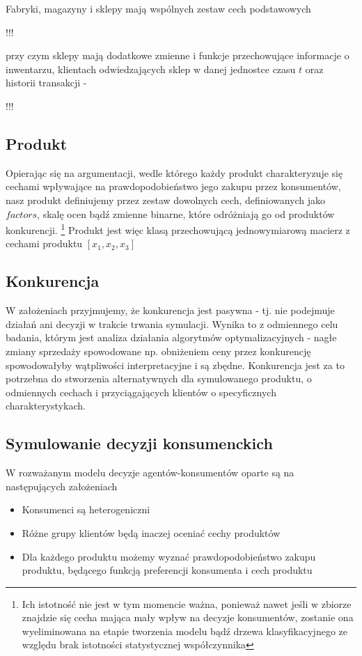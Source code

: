 \documentclass{article}
\begin{document}
Fabryki, magazyny i sklepy mają wspólnych zestaw cech podstawowych 

!!!

przy czym sklepy mają dodatkowe zmienne i funkcje przechowujące informacje o inwentarzu, klientach odwiedzających sklep w danej jednostce czasu $t$ oraz historii transakcji - 

!!!


\subsection{Produkt}

Opierając się na argumentacji, wedle którego każdy produkt charakteryzuje się cechami wpływające na prawdopodobieństwo jego zakupu przez konsumentów, nasz produkt definiujemy przez zestaw dowolnych cech, definiowanych jako $factors$, skalę ocen bądź zmienne binarne, które odróżniają go od produktów konkurencji. \footnote{Ich istotność nie jest w tym momencie ważna, ponieważ nawet jeśli w zbiorze znajdzie się cecha mająca mały wpływ na decyzje konsumentów, zostanie ona wyeliminowana na etapie tworzenia modelu bądź drzewa klasyfikacyjnego ze względu brak istotności statystycznej współczynnika} Produkt jest więc klasą przechowującą jednowymiarową macierz z cechami produktu $[x_1,x_2,x_3]$

\subsection{Konkurencja}
 
W założeniach przyjmujemy, że konkurencja jest pasywna - tj. nie podejmuje działań ani decyzji w trakcie trwania symulacji. Wynika to z odmiennego celu badania, którym jest analiza działania algorytmów optymalizacyjnych - nagłe zmiany sprzedaży spowodowane np. obniżeniem ceny przez konkurencję spowodowałyby wątpliwości interpretacyjne i są zbędne. Konkurencja jest za to potrzebna do stworzenia alternatywnych dla symulowanego produktu, o odmiennych cechach i przyciągających klientów o specyficznych charakterystykach. 

\subsection{Symulowanie decyzji konsumenckich}

W rozważanym modelu decyzje agentów-konsumentów oparte są na następujących założeniach

	\begin{itemize}
		\item Konsumenci są heterogeniczni
		\item Różne grupy klientów będą inaczej oceniać cechy produktów
		\item Dla każdego produktu możemy wyznać prawdopodobieństwo zakupu produktu, będącego funkcją preferencji konsumenta i cech produktu
	\end{itemize}
\end{document}
